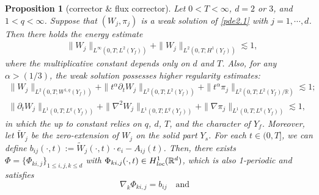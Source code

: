 \documentclass[13pt,CJK]{article}
\theoremstyle{plain}                       %
\newtheorem{proposition}[lemma]{Proposition}
\theoremstyle{remark}
\numberwithin{equation}{section}
\begin{document}


\begin{proposition}[corrector $\&$ flux corrector]\label{prop2.1}
Let $0<T<\infty$, $d=2$ or $3$, and $1<q<\infty$. Suppose that $(W_j,\pi_j)$ is a weak solution of \eqref{pde2.1}
with $j=1,\cdots,d$.
Then there holds the energy estimate
\begin{equation}\label{pde2.14}
\begin{aligned}
&\|W_j\|_{L^{\infty}(0,T;L^2(Y_f))}+
\|W_j\|_{L^{2}(0,T;H^{1}(Y_f))}\lesssim1,
\end{aligned}
\end{equation}
where the multiplicative constant depends only on $d$ and $T$.
Also, for any $\alpha>(1/3)$,
the weak solution possesses higher regularity estimates:
\begin{subequations}
\begin{align}
\|W_j\|_{L^2(0,T;W^{1,q}(Y_f))}
+\|t^{\alpha}\partial_t W_j\|_{L^2(0,T;L^{2}(Y_f))}
+\|t^{\alpha}\pi_j\|_{L^2(0,T;L^{2}(Y_f)/\mathbb{R})}\lesssim 1;\label{pde3.33a}\\
\|\partial_t W_j\|_{L^1(0,T;L^q(Y_f))}
+ \|\nabla^2 W_j\|_{L^1(0,T;L^q(Y_f))}
+ \|\nabla \pi_j\|_{L^1(0,T;L^{q}(Y_f))}\lesssim 1,\label{pde3.33b}
\end{align}
\end{subequations}
in which the up to constant relies on $q$, $d$, $T$, and the character of $Y_f$.  Moreover, let
$\tilde{W}_j$ be the zero-extension of $W_j$ on the solid part $Y_s$.
For each $t\in(0,T]$, we can define  $b_{ij}(\cdot,t):=\tilde{W}_j(\cdot,t)\cdot e_i-A_{ij}(t)$.  Then,
there exists $\Phi=\{\Phi_{ki,j}\}_{1\leq i,j,k\leq d}$
with $\Phi_{ki,j}(\cdot,t)\in H^{1}_{\emph{loc}}(\mathbb{R}^d)$,
which is also 1-periodic and satisfies
\begin{equation}\label{anti-sym}
 \nabla_k\Phi_{ki,j}=
 b_{ij}\quad \text{and}\quad

\end{equation}
\end{proposition}
\end{document}

